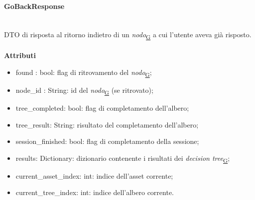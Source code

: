 \documentclass[a4paper,12pt]{article}
\begin{document}
                \paragraph{GoBackResponse}\mbox{}\\
                    DTO di risposta al ritorno indietro di un \textit{nodo}\textsubscript{\href{https://atlasteam9.github.io/Atlas/glossario.html\#Nodo}{G}} a cui l'utente aveva già risposto.\\\\
                    \textbf{Attributi}
                    \begin{itemize}
                        \item {\ttfamily found : bool}: flag di ritrovamento del \textit{nodo}\textsubscript{\href{https://atlasteam9.github.io/Atlas/glossario.html\#Nodo}{G}};
                        \item {\ttfamily node\_id : String}: id del \textit{nodo}\textsubscript{\href{https://atlasteam9.github.io/Atlas/glossario.html\#Nodo}{G}} (se ritrovato);
                        \item {\ttfamily tree\_completed: bool}: flag di completamento dell'albero;
                        \item {\ttfamily tree\_result: String}: risultato del completamento dell'albero;
                        \item {\ttfamily session\_finished: bool}: flag di completamento della sessione; 
                        \item {\ttfamily results: Dictionary}: dizionario contenente i risultati dei \textit{decision tree}\textsubscript{\href{https://atlasteam9.github.io/Atlas/glossario.html\#DecisionTree}{G}};
                        \item {\ttfamily current\_asset\_index: int}: indice dell'asset corrente;
                        \item {\ttfamily current\_tree\_index: int}: indice dell'albero corrente.
                    \end{itemize}
\end{document}

